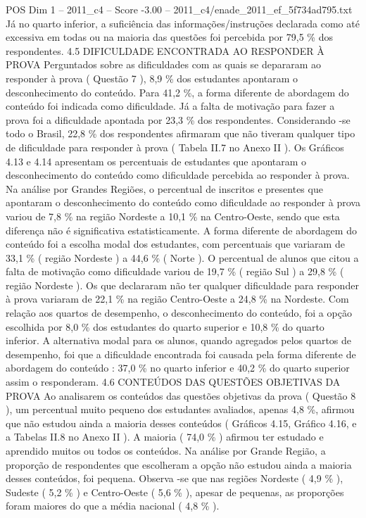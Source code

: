\begin{textsample}{POS Dim 1 – 2011\_c4 – Score -3.00 – 2011\_c4/enade\_2011\_ef\_5f734ad795.txt}
Já no quarto inferior, a suficiência das informações/instruções declarada como até excessiva em todas ou na maioria das questões foi percebida por 79,5 \% dos respondentes. 4.5 DIFICULDADE ENCONTRADA AO RESPONDER À PROVA Perguntados sobre as dificuldades com as quais se depararam ao responder à prova ( Questão 7 ), 8,9 \% dos estudantes apontaram o desconhecimento do conteúdo.
Para 41,2 \%, a forma diferente de abordagem do conteúdo foi indicada como dificuldade.
Já a falta de motivação para fazer a prova foi a dificuldade apontada por 23,3 \% dos respondentes.
Considerando -se todo o Brasil, 22,8 \% dos respondentes afirmaram que não tiveram qualquer tipo de dificuldade para responder à prova ( Tabela II.7 no Anexo II ).
Os Gráficos 4.13 e 4.14 apresentam os percentuais de estudantes que apontaram o desconhecimento do conteúdo como dificuldade percebida ao responder à prova.
Na análise por Grandes Regiões, o percentual de inscritos e presentes que apontaram o desconhecimento do conteúdo como dificuldade ao responder à prova variou de 7,8 \% na região Nordeste a 10,1 \% na Centro-Oeste, sendo que esta diferença não é significativa estatisticamente.
A forma diferente de abordagem do conteúdo foi a escolha modal dos estudantes, com percentuais que variaram de 33,1 \% ( região Nordeste ) a 44,6 \% ( Norte ).
O percentual de alunos que citou a falta de motivação como dificuldade variou de 19,7 \% ( região Sul ) a 29,8 \% ( região Nordeste ).
Os que declararam não ter qualquer dificuldade para responder à prova variaram de 22,1 \% na região Centro-Oeste a 24,8 \% na Nordeste.
Com relação aos quartos de desempenho, o desconhecimento do conteúdo, foi a opção escolhida por 8,0 \% dos estudantes do quarto superior e 10,8 \% do quarto inferior.
A alternativa modal para os alunos, quando agregados pelos quartos de desempenho, foi que a dificuldade encontrada foi causada pela forma diferente de abordagem do conteúdo : 37,0 \% no quarto inferior e 40,2 \% do quarto superior assim o responderam. 4.6 CONTEÚDOS DAS QUESTÕES OBJETIVAS DA PROVA Ao analisarem os conteúdos das questões objetivas da prova ( Questão 8 ), um percentual muito pequeno dos estudantes avaliados, apenas 4,8 \%, afirmou que não estudou ainda a maioria desses conteúdos ( Gráficos 4.15, Gráfico 4.16, e a Tabelas II.8 no Anexo II ).
A maioria ( 74,0 \% ) afirmou ter estudado e aprendido muitos ou todos os conteúdos.
Na análise por Grande Região, a proporção de respondentes que escolheram a opção não estudou ainda a maioria desses conteúdos, foi pequena.
Observa -se que nas regiões Nordeste ( 4,9 \% ), Sudeste ( 5,2 \% ) e Centro-Oeste ( 5,6 \% ), apesar de pequenas, as proporções foram maiores do que a média nacional ( 4,8 \% ).

\end{textsample}

